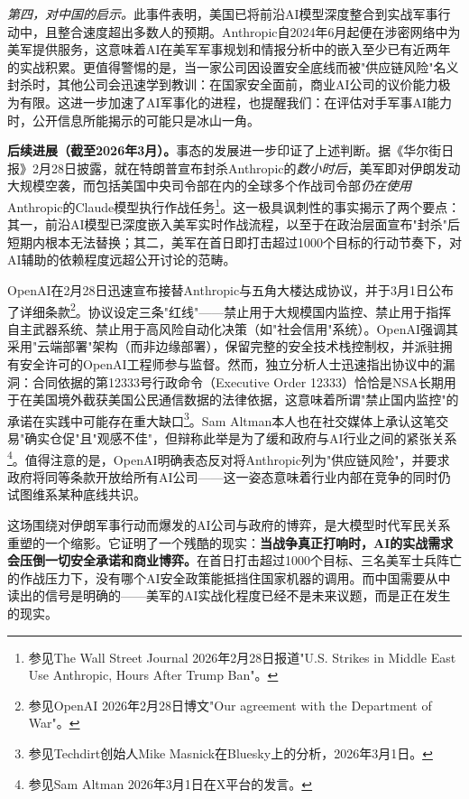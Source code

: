 \emph{第四，对中国的启示。}此事件表明，美国已将前沿AI模型深度整合到实战军事行动中，且整合速度超出多数人的预期。Anthropic自2024年6月起便在涉密网络中为美军提供服务，这意味着AI在美军军事规划和情报分析中的嵌入至少已有近两年的实战积累。更值得警惕的是，当一家公司因设置安全底线而被"供应链风险"名义封杀时，其他公司会迅速学到教训：在国家安全面前，商业AI公司的议价能力极为有限。这进一步加速了AI军事化的进程，也提醒我们：在评估对手军事AI能力时，公开信息所能揭示的可能只是冰山一角。

{\bfseries 后续进展（截至2026年3月）。}事态的发展进一步印证了上述判断。据《华尔街日报》2月28日披露，就在特朗普宣布封杀Anthropic的\emph{数小时后}，美军即对伊朗发动大规模空袭，而包括美国中央司令部在内的全球多个作战司令部\emph{仍在使用}Anthropic的Claude模型执行作战任务\footnote{参见The Wall Street Journal 2026年2月28日报道"U.S. Strikes in Middle East Use Anthropic, Hours After Trump Ban"。}。这一极具讽刺性的事实揭示了两个要点：其一，前沿AI模型已深度嵌入美军实时作战流程，以至于在政治层面宣布"封杀"后短期内根本无法替换；其二，美军在首日即打击超过1000个目标的行动节奏下，对AI辅助的依赖程度远超公开讨论的范畴。

OpenAI在2月28日迅速宣布接替Anthropic与五角大楼达成协议，并于3月1日公布了详细条款\footnote{参见OpenAI 2026年2月28日博文"Our agreement with the Department of War"。}。协议设定三条"红线"——禁止用于大规模国内监控、禁止用于指挥自主武器系统、禁止用于高风险自动化决策（如"社会信用"系统）。OpenAI强调其采用"云端部署"架构（而非边缘部署），保留完整的安全技术栈控制权，并派驻拥有安全许可的OpenAI工程师参与监督。然而，独立分析人士迅速指出协议中的漏洞：合同依据的第12333号行政命令（Executive Order 12333）恰恰是NSA长期用于在美国境外截获美国公民通信数据的法律依据，这意味着所谓"禁止国内监控"的承诺在实践中可能存在重大缺口\footnote{参见Techdirt创始人Mike Masnick在Bluesky上的分析，2026年3月1日。}。Sam Altman本人也在社交媒体上承认这笔交易"确实仓促"且"观感不佳"，但辩称此举是为了缓和政府与AI行业之间的紧张关系\footnote{参见Sam Altman 2026年3月1日在X平台的发言。}。值得注意的是，OpenAI明确表态反对将Anthropic列为"供应链风险"，并要求政府将同等条款开放给所有AI公司——这一姿态意味着行业内部在竞争的同时仍试图维系某种底线共识。

这场围绕对伊朗军事行动而爆发的AI公司与政府的博弈，是大模型时代军民关系重塑的一个缩影。它证明了一个残酷的现实：\textbf{当战争真正打响时，AI的实战需求会压倒一切安全承诺和商业博弈。}在首日打击超过1000个目标、三名美军士兵阵亡的作战压力下，没有哪个AI安全政策能抵挡住国家机器的调用。而中国需要从中读出的信号是明确的——美军的AI实战化程度已经不是未来议题，而是正在发生的现实。

